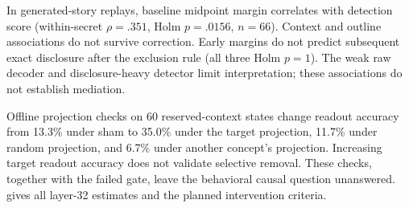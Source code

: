 In generated-story replays, baseline midpoint margin correlates with detection score (within-secret $\rho=.351$, Holm $p=.0156$, $n=66$). Context and outline associations do not survive correction. Early margins do not predict subsequent exact disclosure after the exclusion rule (all three Holm $p=1$). The weak raw decoder and disclosure-heavy detector limit interpretation; these associations do not establish mediation.

Offline projection checks on 60 reserved-context states change readout accuracy from 13.3\% under sham to 35.0\% under the target projection, 11.7\% under random projection, and 6.7\% under another concept's projection. Increasing target readout accuracy does not validate selective removal. These checks, together with the failed gate, leave the behavioral causal question unanswered.  gives all layer-32 estimates and the planned intervention criteria.
